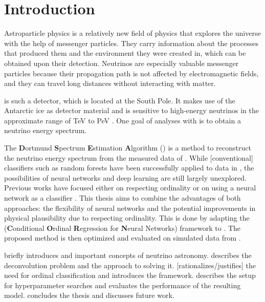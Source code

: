 \chapter{Introduction}
Astroparticle physics is a relatively new field of physics
  that explores the universe
    with the help of messenger particles.
They carry information about
    the processes that produced them
    and the environment they were created in,
  which can be obtained upon their detection.
Neutrinos are especially valuable messenger particles
  because their propagation path is not affected by electromagnetic fields,
  and they can travel long distances without interacting with matter.


\icecube{} is such a detector,
  which is located at the South Pole.
It makes use of the Antarctic ice as detector material
  and is sensitive to high-energy neutrinos
    in the approximate range of \si{\tera\electronvolt} to \si{\peta\electronvolt} \cite{icecube_aartsen}.
%
One goal of analyses with \icecube{} is
  to obtain a neutrino energy spectrum.

The \textbf{D}ortmund \textbf{S}pectrum \textbf{E}stimation \textbf{A}lgorithm (\dsea{}) \cite{dsea_unification}
is a method to reconstruct the neutrino energy spectrum
  from the measured data of \icecube{}.
While [conventional] classifiers %
  such as random forests
have been successfully applied to \icecube{} data in \dsea{},
the possibilities of neural networks and deep learning are still largely unexplored. %
%
Previous works
have focused either
  on respecting ordinality \cite{dsea_jan} %
  or on using a neural network as a classifier \cite{dsea_samuel}.
This thesis aims to combine the advantages of both approaches:
  the flexibility of neural networks
  and the potential improvements in physical plausibility
    due to respecting ordinality.
This is done by adapting the
\corn{} (\textbf{C}onditional \textbf{O}rdinal \textbf{R}egression for \textbf{N}eural Networks) framework \cite{corn}
to \dsea{}.
The proposed method is then optimized and evaluated
  on simulated data from \icecube{}.

 briefly introduces \icecube{} and important concepts of neutrino astronomy.
 describes the deconvolution problem and the \dsea{} approach to solving it.
 [rationalizes/justifies] the need for ordinal classification and introduces the \corn{} framework.
 describes the setup for hyperparameter searches and evaluates the performance of the resulting model. %
 concludes the thesis and discusses future work.
